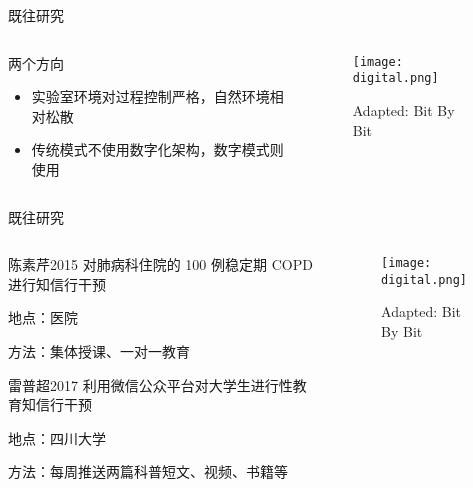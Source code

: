 \begin{frame}{既往研究}
\begin{columns}
    \begin{column}{0.4\textwidth}
   
\begin{block}{两个方向}
    \begin{itemize}
        \item 实验室环境对过程控制严格，自然环境相对松散
        \item 传统模式不使用数字化架构，数字模式则使用
    \end{itemize}
\end{block}
\end{column}
\begin{column}{0.6\textwidth}

\begin{figure}[h]
    \centering
    \texttt{[image: digital.png]}
    \caption{Adapted: Bit By Bit }
\end{figure}
\end{column}
\end{columns}
\end{frame}
\begin{frame}{既往研究}
\begin{columns}
    \begin{column}{0.4\textwidth}
\begin{exampleblock}{陈素芹2015}
    对肺病科住院的 100 例稳定期 COPD 进行知信行干预
    
    地点：医院
    
    方法：集体授课、一对一教育
    
\end{exampleblock}

\begin{exampleblock}{雷普超2017}
利用微信公众平台对大学生进行性教育知信行干预

地点：四川大学

方法：每周推送两篇科普短文、视频、书籍等
    
\end{exampleblock}
\end{column}
\begin{column}{0.6\textwidth}
    
    \begin{figure}[h]
        \centering
        \texttt{[image: digital.png]}
        \caption{Adapted: Bit By Bit }
    \end{figure}
\end{column}
\end{columns}
\end{frame}



